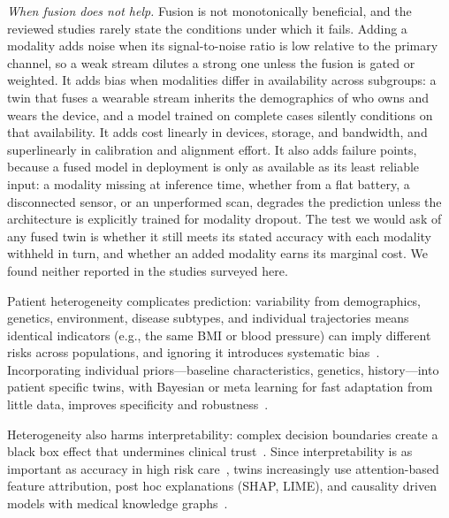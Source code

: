 \documentclass[journal]{IEEEtran}
\begin{document}
\emph{When fusion does not help.} Fusion is not monotonically beneficial, and the reviewed studies rarely state the conditions under which it fails. Adding a modality adds noise when its signal-to-noise ratio is low relative to the primary channel, so a weak stream dilutes a strong one unless the fusion is gated or weighted. It adds bias when modalities differ in availability across subgroups: a twin that fuses a wearable stream inherits the demographics of who owns and wears the device, and a model trained on complete cases silently conditions on that availability. It adds cost linearly in devices, storage, and bandwidth, and superlinearly in calibration and alignment effort. It also adds failure points, because a fused model in deployment is only as available as its least reliable input: a modality missing at inference time, whether from a flat battery, a disconnected sensor, or an unperformed scan, degrades the prediction unless the architecture is explicitly trained for modality dropout. The test we would ask of any fused twin is whether it still meets its stated accuracy with each modality withheld in turn, and whether an added modality earns its marginal cost. We found neither reported in the studies surveyed here.

Patient heterogeneity complicates prediction: variability from demographics, genetics, environment, disease subtypes, and individual trajectories means identical indicators (e.g., the same BMI or blood pressure) can imply different risks across populations, and ignoring it introduces systematic bias~\cite{obermeyer2016predicting,rajkomar2019machine,yu2018artificial}. Incorporating individual priors---baseline characteristics, genetics, history---into patient specific twins, with Bayesian or meta learning for fast adaptation from little data, improves specificity and robustness~\cite{bjornsson2020digitaltwins}.

Heterogeneity also harms interpretability: complex decision boundaries create a black box effect that undermines clinical trust~\cite{rudin2019stopexplaining}. Since interpretability is as important as accuracy in high risk care~\cite{tonekaboni2019clinicians,lundberg2017unified,voigt2021digital}, twins increasingly use attention-based feature attribution, post hoc explanations (SHAP, LIME), and causality driven models with medical knowledge graphs~\cite{ahmad2018interpretable}.
\end{document}
